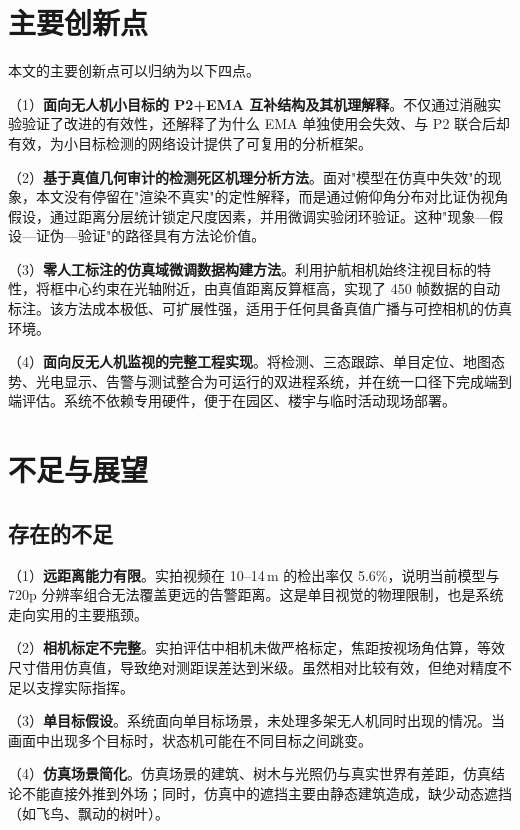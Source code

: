\section{主要创新点}

本文的主要创新点可以归纳为以下四点。

（1）\textbf{面向无人机小目标的 P2+EMA 互补结构及其机理解释}。不仅通过消融实验验证了改进的有效性，还解释了为什么 EMA 单独使用会失效、与 P2 联合后却有效，为小目标检测的网络设计提供了可复用的分析框架。

（2）\textbf{基于真值几何审计的检测死区机理分析方法}。面对"模型在仿真中失效"的现象，本文没有停留在"渲染不真实"的定性解释，而是通过俯仰角分布对比证伪视角假设，通过距离分层统计锁定尺度因素，并用微调实验闭环验证。这种"现象—假设—证伪—验证"的路径具有方法论价值。

（3）\textbf{零人工标注的仿真域微调数据构建方法}。利用护航相机始终注视目标的特性，将框中心约束在光轴附近，由真值距离反算框高，实现了 450 帧数据的自动标注。该方法成本极低、可扩展性强，适用于任何具备真值广播与可控相机的仿真环境。

（4）\textbf{面向反无人机监视的完整工程实现}。将检测、三态跟踪、单目定位、地图态势、光电显示、告警与测试整合为可运行的双进程系统，并在统一口径下完成端到端评估。系统不依赖专用硬件，便于在园区、楼宇与临时活动现场部署。

\section{不足与展望}

\subsection{存在的不足}

（1）\textbf{远距离能力有限}。实拍视频在 10--14\,m 的检出率仅 5.6\%，说明当前模型与 720p 分辨率组合无法覆盖更远的告警距离。这是单目视觉的物理限制，也是系统走向实用的主要瓶颈。

（2）\textbf{相机标定不完整}。实拍评估中相机未做严格标定，焦距按视场角估算，等效尺寸借用仿真值，导致绝对测距误差达到米级。虽然相对比较有效，但绝对精度不足以支撑实际指挥。

（3）\textbf{单目标假设}。系统面向单目标场景，未处理多架无人机同时出现的情况。当画面中出现多个目标时，状态机可能在不同目标之间跳变。

（4）\textbf{仿真场景简化}。仿真场景的建筑、树木与光照仍与真实世界有差距，仿真结论不能直接外推到外场；同时，仿真中的遮挡主要由静态建筑造成，缺少动态遮挡（如飞鸟、飘动的树叶）。

